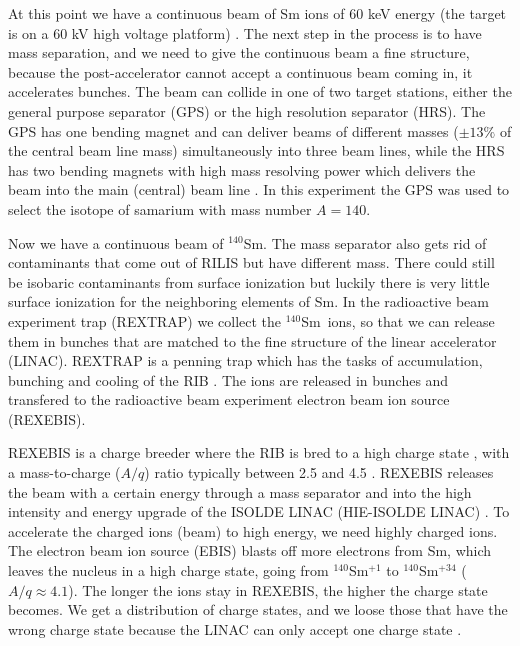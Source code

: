 \documentclass[twoside,english]{uiofysmaster/uiofysmaster}
\newcommand{\Sm}{$^{140}$Sm} %
\begin{document}
At this point we have a continuous beam of Sm ions of 60 keV energy (the target is on a 60 kV high voltage platform) \cite{ISOLDE-web, TIF}. The next step in the process is to have mass separation, and we need to give the continuous beam a fine structure, because the post-accelerator cannot accept a continuous beam coming in, it accelerates bunches. The beam can collide in one of two target stations, either the general purpose separator (GPS) or the high resolution separator (HRS). The GPS has one bending magnet and can deliver beams of different masses ($\pm 13 \%$ of the central beam line mass) simultaneously into three beam lines, while the HRS has two bending magnets with high mass resolving power which delivers the beam into the main (central) beam line \cite{GPS, TIF}. In this experiment the GPS was used to select the isotope of samarium with mass number $A = 140$. 

Now we have a continuous beam of \Sm. The mass separator also gets rid of contaminants that come out of RILIS but have different mass. There could still be isobaric contaminants from surface ionization but luckily there is very little surface ionization for the neighboring elements of Sm. In the radioactive beam experiment trap (REXTRAP) we collect the \Sm\ ions, so that we can release them in bunches that are matched to the fine structure of the linear accelerator (LINAC). REXTRAP is a penning trap which has the tasks of accumulation, bunching and cooling of the RIB \cite{HIE-ISOLDE, REXTRAP1, REXTRAP2}. The ions are released in bunches and transfered to the radioactive beam experiment electron beam ion source (REXEBIS).

REXEBIS is a charge breeder where the RIB is bred to a high charge state \cite{REXEBIS}, with a mass-to-charge ($A/q$) ratio typically between 2.5 and 4.5 \cite{Post-acc}. REXEBIS releases the beam with a certain energy through a mass separator and into the high intensity and energy upgrade of the ISOLDE LINAC (HIE-ISOLDE LINAC) \cite{HIE-ISOLDE}. To accelerate the charged ions (beam) to high energy, we need highly charged ions. The electron beam ion source (EBIS) blasts off more electrons from Sm, which leaves the nucleus in a high charge state, going from \Sm$^{+1}$ to \Sm$^{+34}$ ($A/q \approx 4.1$). The longer the ions stay in REXEBIS, the higher the charge state becomes. We get a distribution of charge states, and we loose those that have the wrong charge state because the LINAC can only accept one charge state \cite{REX-web, HIE-web, EBIS2002, EBIS2010}.
\end{document}
